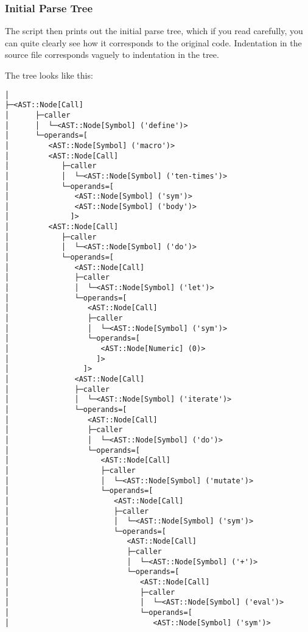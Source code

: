 \documentclass{article}
\begin{document}
    \subsubsection{Initial Parse Tree}

    The script then prints out the initial parse tree, which if you read carefully,
    you can quite clearly see how it corresponds to the original code. Indentation
    in the source file corresponds vaguely to indentation in the tree.

    The tree looks like this:

    \setlength{\lineskip}{0pt}
    \begin{Verbatim}[baselinestretch=0.75]
│
├─<AST::Node[Call]
│      ├─caller
│      │  └─<AST::Node[Symbol] ('define')>
│      └─operands=[
│         <AST::Node[Symbol] ('macro')>
│         <AST::Node[Call]
│            ├─caller
│            │  └─<AST::Node[Symbol] ('ten-times')>
│            └─operands=[
│               <AST::Node[Symbol] ('sym')>
│               <AST::Node[Symbol] ('body')>
│              ]>
│         <AST::Node[Call]
│            ├─caller
│            │  └─<AST::Node[Symbol] ('do')>
│            └─operands=[
│               <AST::Node[Call]
│               ├─caller
│               │  └─<AST::Node[Symbol] ('let')>
│               └─operands=[
│                  <AST::Node[Call]
│                  ├─caller
│                  │  └─<AST::Node[Symbol] ('sym')>
│                  └─operands=[
│                     <AST::Node[Numeric] (0)>
│                    ]>
│                 ]>
│               <AST::Node[Call]
│               ├─caller
│               │  └─<AST::Node[Symbol] ('iterate')>
│               └─operands=[
│                  <AST::Node[Call]
│                  ├─caller
│                  │  └─<AST::Node[Symbol] ('do')>
│                  └─operands=[
│                     <AST::Node[Call]
│                     ├─caller
│                     │  └─<AST::Node[Symbol] ('mutate')>
│                     └─operands=[
│                        <AST::Node[Call]
│                        ├─caller
│                        │  └─<AST::Node[Symbol] ('sym')>
│                        └─operands=[
│                           <AST::Node[Call]
│                           ├─caller
│                           │  └─<AST::Node[Symbol] ('+')>
│                           └─operands=[
│                              <AST::Node[Call]
│                              ├─caller
│                              │  └─<AST::Node[Symbol] ('eval')>
│                              └─operands=[
│                                 <AST::Node[Symbol] ('sym')>

\end{Verbatim}
\end{document}
